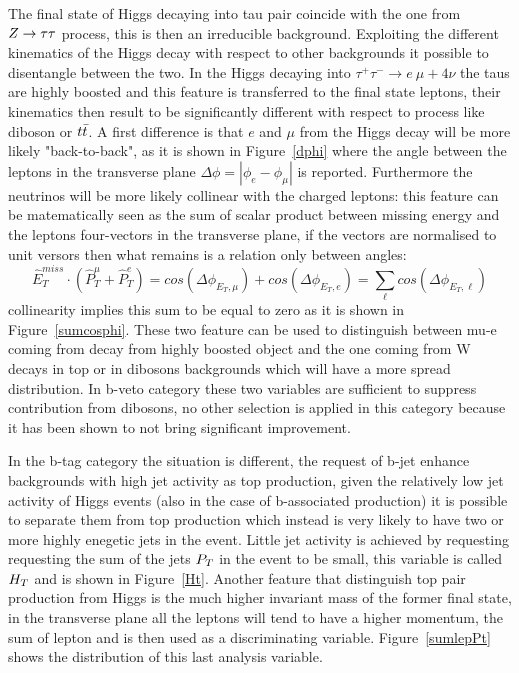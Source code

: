 The final state of Higgs decaying into tau pair coincide with the one from  $Z\rightarrow \tau\tau$  process, this is then an irreducible 
background. Exploiting the different kinematics of the Higgs decay with respect to other backgrounds it possible to disentangle
between the two. In the Higgs decaying into $\tau^{+} \tau^{-} \rightarrow e ~ \mu + 4\nu$ the taus are highly boosted
and this feature is transferred to the final state leptons, their kinematics then result to be  significantly different 
with respect to process like diboson or $t\bar{t}$. A first difference is that  $e$ and $\mu$ from the Higgs decay will be more likely "back-to-back",
as it is shown in Figure~\ref{dphi} where the angle between the leptons in the transverse plane $\Delta\phi = |\phi_{e} - \phi_{\mu}|$ 
is reported.  Furthermore the neutrinos will be more likely collinear with the charged leptons:
this feature can be matematically seen as the sum of scalar product between missing energy and the leptons four-vectors in the
transverse plane, if the vectors are normalised to unit versors then what remains is a relation only between angles:
$$ \hat{E}_{T}^{miss} \cdot ( \hat{P}_{T}^{\mu} + \hat{P}_{T}^{e} ) = cos(\Delta\phi_{E_{T},\mu}) + cos(\Delta\phi_{E_{T},e}) = \sum_\ell cos(\Delta\phi_{E_{T},\ell}) $$
collinearity implies this sum to be equal to zero as it is shown in Figure~\ref{sumcosphi}. 
These two feature can be used to distinguish between mu-e coming from decay from highly 
boosted object and the one coming from W decays in top or in dibosons backgrounds which will have a more spread distribution.
In b-veto category these two variables are sufficient to suppress contribution from dibosons,
no other selection is applied in this category because it has been shown to not bring significant improvement.

In the b-tag category the situation is different, 
the  request of b-jet enhance backgrounds with high jet activity as top production, given the relatively low
jet activity of Higgs events (also in the case of b-associated production) it is possible to separate them from
top production which instead is very likely to have two or more highly enegetic jets in the event.
Little jet activity is achieved by requesting requesting the sum of the jets $P_{T}$ in the event to be small, this variable is called $H_{T}$
and is shown in Figure~\ref{Ht}.
Another feature that distinguish top pair production from Higgs is the much higher invariant mass of the former final state,
in the transverse plane all the leptons will tend to have a higher momentum, the sum of lepton \pt and \met is then used as
a discriminating variable. Figure~\ref{sumlepPt} shows the distribution of this last analysis variable.

